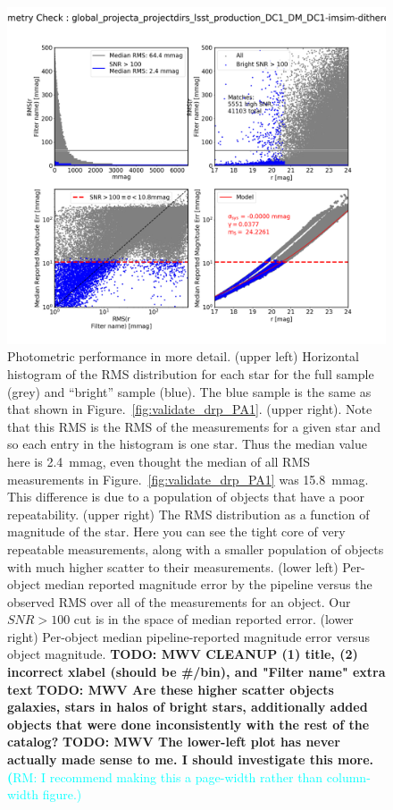 \documentclass[twocolumn]{aastex62}
\newcommand{\rachel}[1]{{\textcolor{cyan}{{\textbf (RM: #1)}}}}
\begin{document}
\begin{figure}
\centering
\includegraphics[width=0.9\columnwidth]{DC1-imsim-dithered_r_check_photometry.png}
\caption{Photometric performance in more detail.  (upper left) Horizontal histogram of the RMS distribution for each star for the full sample (grey) and ``bright'' sample (blue).  The blue sample is the same as that shown in Figure.~\ref{fig:validate_drp_PA1}.
(upper right).  Note that this RMS is the RMS of the measurements for a given star and so each entry in the histogram is one star.  Thus the median value here is 2.4~mmag, even thought the median of all RMS measurements in Figure.~\ref{fig:validate_drp_PA1} was 15.8~mmag.  This difference is due to a population of objects that have a poor repeatability.
(upper right) The RMS distribution as a function of magnitude of the star.  Here you can see the tight core of very repeatable measurements, along with a smaller population of objects with much higher scatter to their measurements.
(lower left) Per-object median reported magnitude error by the pipeline versus the observed RMS over all of the measurements for an object.  Our $SNR>100$ cut is in the space of median reported error.
(lower right)
Per-object median pipeline-reported magnitude error versus object magnitude.
 {\bf TODO: MWV CLEANUP (1) title, (2) incorrect xlabel (should be \#/bin),  and "Filter name" extra text}
 {\bf TODO: MWV  Are these higher scatter objects galaxies, stars in halos of bright stars, additionally added objects that were done inconsistently with the rest of the catalog?}
 {\bf TODO: MWV  The lower-left plot has never actually made sense to me.  I should investigate this
   more.} \rachel{I recommend making this a page-width rather than column-width figure.}}

\label{fig:validate_drp_check_photometry}
\end{figure}
\end{document}
